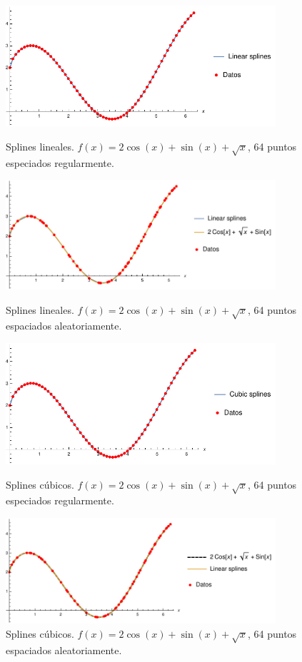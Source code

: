 \documentclass[11pt,letterpaper]{article}
\begin{document}
\begin{figure}
\centering
\includegraphics[width=10cm]{img/21.pdf}
\caption{Splines lineales. $f(x)=2\cos (x)+\sin (x)+\sqrt{x}$, 64 puntos especiados regularmente.}
\includegraphics[width=10cm]{img/22.pdf}
\caption{Splines lineales. $f(x)=2\cos (x)+\sin (x)+\sqrt{x}$, 64 puntos espaciados aleatoriamente.}
\includegraphics[width=10cm]{img/23.pdf}
\caption{Splines cúbicos. $f(x)=2\cos (x)+\sin (x)+\sqrt{x}$, 64 puntos especiados regularmente.}
\includegraphics[width=10cm]{img/24.pdf}
\caption{Splines cúbicos. $f(x)=2\cos (x)+\sin (x)+\sqrt{x}$, 64 puntos espaciados aleatoriamente.}
\end{figure}
\end{document}
